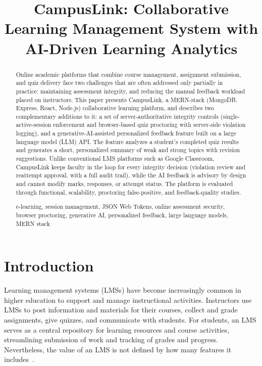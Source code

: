 \documentclass[conference]{IEEEtran}
\begin{document}
\title{CampusLink: Collaborative Learning Management System with AI-Driven Learning Analytics}

\maketitle
\begin{abstract}
Online academic platforms that combine course management, assignment submission, and quiz delivery face two challenges that are often addressed only partially in practice: maintaining assessment integrity, and reducing the manual feedback workload placed on instructors. This paper presents CampusLink, a MERN-stack (MongoDB, Express, React, Node.js) collaborative learning platform, and describes two complementary additions to it: a set of server-authoritative integrity controls (single-active-session enforcement and browser-based quiz proctoring with server-side violation logging), and a generative-AI-assisted personalized feedback feature built on a large language model (LLM) API. The feature analyzes a student's completed quiz results and generates a short, personalized summary of weak and strong topics with revision suggestions. Unlike conventional LMS platforms such as Google Classroom, CampusLink keeps faculty in the loop for every integrity decision (violation review and reattempt approval, with a full audit trail), while the AI feedback is advisory by design and cannot modify marks, responses, or attempt status. The platform is evaluated through functional, scalability, proctoring false-positive, and feedback-quality studies.
\begin{IEEEkeywords}
e-learning, session management, JSON Web Tokens, online assessment security, browser proctoring, generative AI, personalized feedback, large language models, MERN stack
\end{IEEEkeywords}
\end{abstract}

\section{Introduction}

Learning management systems (LMSs) have become increasingly common in higher education to support and manage instructional activities. Instructors use LMSs to post information and materials for their courses, collect and grade assignments, give quizzes, and communicate with students. For students, an LMS serves as a central repository for learning resources and course activities, streamlining submission of work and tracking of grades and progress. Nevertheless, the value of an LMS is not defined by how many features it includes~\cite{lmssuccess,lmsacceptance}.
\end{document}
